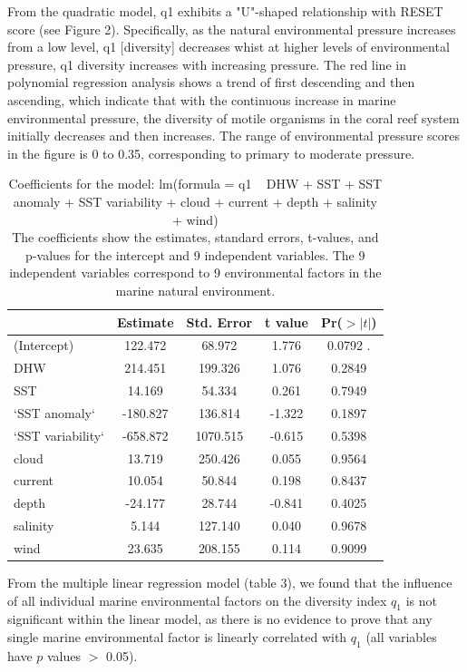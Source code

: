 \documentclass[a4paper, 11]{article}
\begin{document}
From the quadratic model, q1 exhibits a "U"-shaped relationship with RESET score (see Figure 2). Specifically, as the natural environmental pressure increases from a low level, q1 [diversity] decreases whist at higher levels of environmental pressure, q1 diversity increases with increasing pressure. The red line in polynomial regression analysis shows a trend of first descending and then ascending, which indicate that with the continuous increase in marine environmental pressure, the diversity of motile organisms in the coral reef system initially decreases and then increases. The range of environmental pressure scores in the figure is 0 to 0.35, corresponding to primary to moderate pressure.


\begin{table}[H]
\centering
\begin{tabular}{lcccc}
\toprule
 & Estimate & Std. Error & t value & Pr($>|t|$) \\
\midrule
(Intercept) & 122.472 & 68.972 & 1.776 & 0.0792 . \\
DHW & 214.451 & 199.326 & 1.076 & 0.2849 \\
SST & 14.169 & 54.334 & 0.261 & 0.7949 \\
‘SST anomaly‘ & -180.827 & 136.814 & -1.322 & 0.1897 \\
‘SST variability‘ & -658.872 & 1070.515 & -0.615 & 0.5398 \\
cloud & 13.719 & 250.426 & 0.055 & 0.9564 \\
current & 10.054 & 50.844 & 0.198 & 0.8437 \\
depth & -24.177 & 28.744 & -0.841 & 0.4025 \\
salinity & 5.144 & 127.140 & 0.040 & 0.9678 \\
wind & 23.635 & 208.155 & 0.114 & 0.9099 \\
\bottomrule
\end{tabular}
\caption{Coefficients for the model: lm(formula = q1 ~ DHW + SST + SST anomaly + SST variability + cloud + current + depth + salinity + wind)\\
The coefficients show the estimates, standard errors, t-values, and p-values for the intercept and 9 independent variables. The 9 independent variables correspond to 9 environmental factors in the marine natural environment.}
\label{tab:model_coefficients}
\end{table}

From the multiple linear regression model (table 3), we found that the influence of all individual marine environmental factors on the diversity index \(q_1\) is not significant within the linear model, as there is no evidence to prove that any single marine environmental factor is linearly correlated with \(q_1\) (all variables have \(p\) values $>$ 0.05). 
\end{document}
